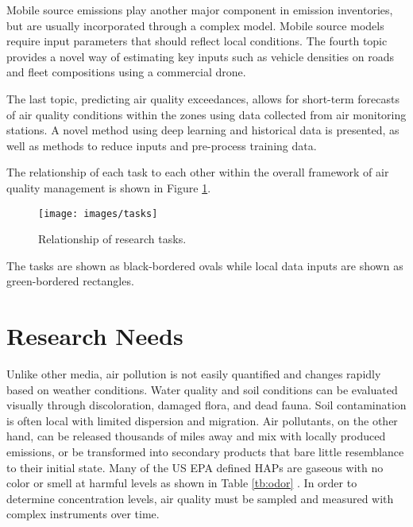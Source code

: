 Mobile source emissions play another major component in emission inventories, but are usually incorporated through a complex model. Mobile source models require input parameters that should reflect local conditions. The fourth topic provides a novel way of estimating key inputs such as vehicle densities on roads and fleet compositions using a commercial drone.

The last topic, predicting air quality exceedances, allows for short-term forecasts of air quality conditions within the zones using data collected from air monitoring stations. A novel method using deep learning and historical data is presented, as well as methods to reduce inputs and pre-process training data. 

The relationship of each task to each other within the overall framework of air quality management is shown in Figure \ref{fig:tasks}.
%
\begin{figure}[H]
\centering
\texttt{[image: images/tasks]}  %
\caption{Relationship of research tasks.}
\label{fig:tasks}
\end{figure}

The tasks are shown as black-bordered ovals while local data inputs are shown as green-bordered rectangles.
%

\section{Research Needs}

Unlike other media,  air pollution is not easily quantified and changes rapidly based on weather conditions. Water quality and soil conditions can be evaluated visually through discoloration, damaged flora, and dead fauna. Soil contamination is often local with limited dispersion and migration. Air pollutants, on the other hand, can be released thousands of miles away and mix with locally produced emissions, or be transformed into secondary products that bare little resemblance to their initial state. Many of the US EPA defined HAPs are gaseous with no color or smell at harmful levels as shown in Table \ref{tb:odor} \citep{Murnane2013}. In order to determine concentration levels, air quality must be sampled and measured with complex instruments over time.

